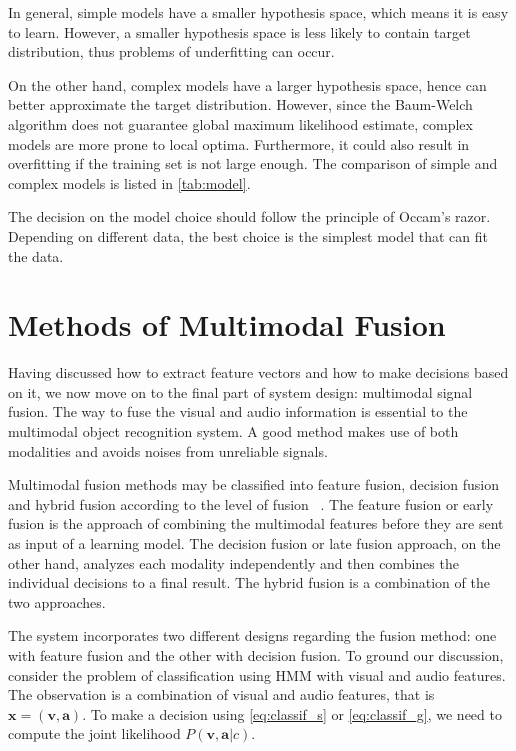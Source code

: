 \documentclass[letterpaper, 10 pt, conference]{ieeeconf}
\begin{document}
In general, simple models have a smaller hypothesis space, which means it is easy to learn. However, a smaller hypothesis space is less likely to contain target distribution, thus problems of underfitting can occur.

On the other hand, complex models have a larger hypothesis space, hence can better approximate the target distribution. However, since the Baum-Welch algorithm does not guarantee global maximum likelihood estimate, complex models are more prone to local optima. Furthermore, it could also result in overfitting if the training set is not large enough. The comparison of simple and complex models is listed in \cref{tab:model}.

The decision on the model choice should follow the principle of Occam's razor. Depending on different data, the best choice is the simplest model that can fit the data.

\section{Methods of Multimodal Fusion}
Having discussed how to extract feature vectors and how to make decisions based on it, we now move on to the final part of system design: multimodal signal fusion. The way to fuse the visual and audio information is essential to the multimodal object recognition system. A good method makes use of both modalities and avoids noises from unreliable signals.

Multimodal fusion methods may be classified into feature fusion, decision fusion and hybrid fusion according to the level of fusion ~\cite{atrey_multimodal_2010}. The feature fusion or early fusion is the approach of combining the multimodal features before they are sent as input of a learning model. The decision fusion or late fusion approach, on the other hand, analyzes each modality independently and then combines the individual decisions to a final result. The hybrid fusion is a combination of the two approaches.

The system incorporates two different designs regarding the fusion method: one with feature fusion and the other with decision fusion. To ground our discussion, consider the problem of classification using HMM with visual and audio features. The observation is a combination of visual and audio features, that is $\mathbf{x} = (\mathbf{v}, \mathbf{a})$. To make a decision using \cref{eq:classif_s} or \cref{eq:classif_g}, we need to compute the joint likelihood $P(\mathbf{v},\mathbf{a}|c)$.
\end{document}
